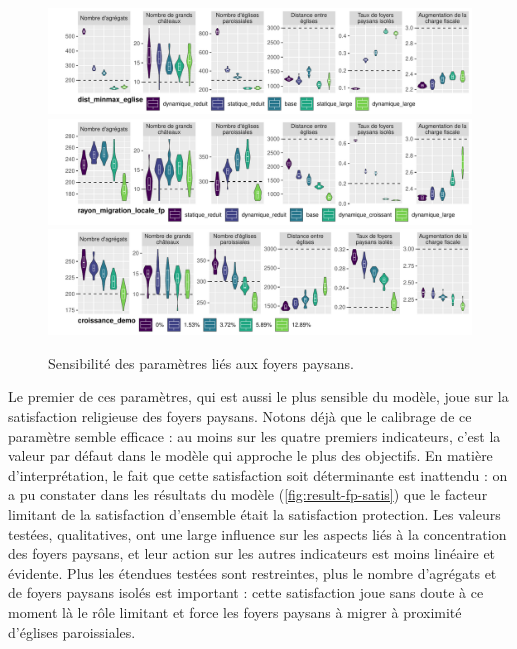 \begin{figure}[H]
	\centering
	\includegraphics[width=\linewidth]{img/sensib/sensibilite_dist_minmax_eglise.pdf}
	\includegraphics[width=\linewidth]{img/sensib/sensibilite_rayon_migration_locale_fp.pdf}
	\includegraphics[width=\linewidth]{img/sensib/sensibilite_croissance_demo.pdf}
	\caption{Sensibilité des paramètres liés aux foyers paysans.}
	\label{fig:sensib-fp}
\end{figure}

Le premier de ces paramètres, qui est aussi le plus sensible du modèle, joue sur la satisfaction religieuse des foyers paysans.
Notons déjà que le calibrage de ce paramètre semble efficace : au moins sur les quatre premiers indicateurs, c'est la valeur par défaut dans le modèle qui approche le plus des objectifs.
En matière d'interprétation, le fait que cette satisfaction soit déterminante est inattendu : on a pu constater dans les résultats du modèle (\cref{fig:result-fp-satis}) que le facteur limitant de la satisfaction d'ensemble était la satisfaction protection.
Les valeurs testées, qualitatives, ont une large influence sur les aspects liés à la concentration des foyers paysans, et leur action sur les autres indicateurs est moins linéaire et évidente.
Plus les étendues testées sont restreintes, plus le nombre d'agrégats et de foyers paysans isolés est important : cette satisfaction joue sans doute à ce moment là le rôle limitant et \og force\fg{} les foyers paysans à migrer à proximité d'églises paroissiales.

